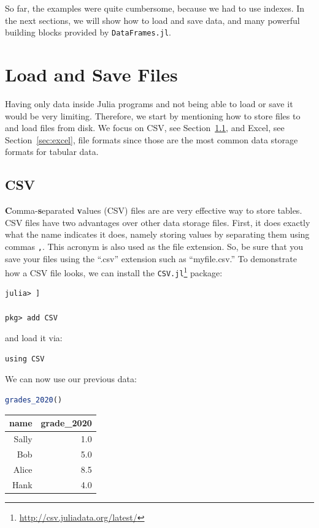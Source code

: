 \documentclass[
  notoc %
]{tufte-book}
\DeclareRobustCommand{\href}[2]{#2\footnote{\url{#1}}}
\newcommand{\passthrough}[1]{#1}
\begin{document}
So far, the examples were quite cumbersome, because we had to use
indexes. In the next sections, we will show how to load and save data,
and many powerful building blocks provided by
\passthrough{\lstinline!DataFrames.jl!}.

\hypertarget{sec:load_save}{%
\section{Load and Save Files}\label{sec:load_save}}

Having only data inside Julia programs and not being able to load or
save it would be very limiting. Therefore, we start by mentioning how to
store files to and load files from disk. We focus on CSV, see
Section~\ref{sec:csv}, and Excel, see Section~\ref{sec:excel}, file
formats since those are the most common data storage formats for tabular
data.

\hypertarget{sec:csv}{%
\subsection{CSV}\label{sec:csv}}

\textbf{C}omma-\textbf{s}eparated \textbf{v}alues (CSV) files are are
very effective way to store tables. CSV files have two advantages over
other data storage files. First, it does exactly what the name indicates
it does, namely storing values by separating them using commas
\passthrough{\lstinline!,!}. This acronym is also used as the file
extension. So, be sure that you save your files using the ``.csv''
extension such as ``myfile.csv.'' To demonstrate how a CSV file looks,
we can install the
\href{http://csv.juliadata.org/latest/}{\passthrough{\lstinline!CSV.jl!}}
package:

\begin{lstlisting}
julia> ]

pkg> add CSV
\end{lstlisting}

and load it via:

\begin{lstlisting}
using CSV
\end{lstlisting}

We can now use our previous data:

\begin{lstlisting}[language=Julia]
grades_2020()
\end{lstlisting}

\begin{longtable}[]{@{}rr@{}}
\toprule
name & grade\_2020 \\
\midrule
\endhead
Sally & 1.0 \\
Bob & 5.0 \\
Alice & 8.5 \\
Hank & 4.0 \\
\bottomrule
\end{longtable}
\end{document}
